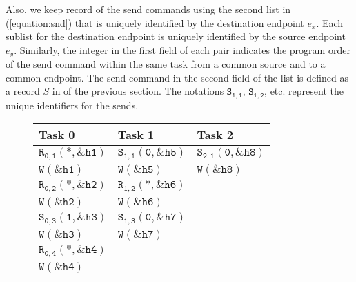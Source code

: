 Also, we keep record of the send commands using the second list in (\ref{equation:snd}) that is uniquely identified by the destination endpoint $\mathit{e}_x$. Each sublist for the destination endpoint is uniquely identified by the source endpoint $\mathit{e}_y$. Similarly, the integer in the first field of each pair indicates the program order of the send command within the same task from a common source and to a common endpoint. The send command in the second field of the list is defined as a record $S$ in  of the previous section. The notations $\mathtt{S_{1,1}}$, $\mathtt{S_{1,2}}$, etc. represent the unique identifiers for the sends.

\begin{figure}
\begin{center}
\setlength{\tabcolsep}{2pt}
\begin{tabular}[c]{l|l|l}
Task 0 & Task 1 & Task 2 \\
\hline
$\mathtt{R_{0,1}(*,\&h1)}$ & $\mathtt{S_{1,1}(0,\&h5)}$ & $\mathtt{S_{2,1}(0,\&h8)}$\\
$\mathtt{W(\&h1)}$&$\mathtt{W(\&h5)}$&$\mathtt{W(\&h8)}$\\
$\mathtt{R_{0,2}(*,\&h2)}$ & $\mathtt{R_{1,2}(*,\&h6)}$ & \\
$\mathtt{W(\&h2)}$&$\mathtt{W(\&h6)}$&\\
$\mathtt{S_{0,3}(1,\&h3)}$ & $\mathtt{S_{1,3}(0,\&h7)}$ & \\
$\mathtt{W(\&h3)}$&$\mathtt{W(\&h7)}$&\\
$\mathtt{R_{0,4}(*,\&h4)}$ & & \\
$\mathtt{W(\&h4)}$&&\\



\end{tabular}
\end{center}
\end{figure}

